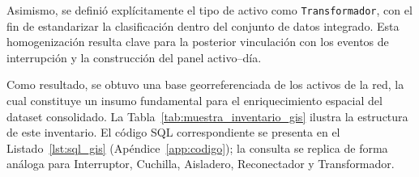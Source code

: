 Asimismo, se definió explícitamente el tipo de activo como \texttt{Transformador}, con el fin de estandarizar la clasificación dentro del conjunto de datos integrado. Esta homogenización resulta clave para la posterior vinculación con los eventos de interrupción y la construcción del panel activo–día.

    Como resultado, se obtuvo una base georreferenciada de los activos de la red, la cual constituye un insumo fundamental para el enriquecimiento espacial del dataset consolidado. La Tabla~\ref{tab:muestra_inventario_gis} ilustra la estructura de este inventario. El código SQL correspondiente se presenta en el Listado~\ref{lst:sql_gis} (Apéndice~\ref{app:codigo}); la consulta se replica de forma análoga para Interruptor, Cuchilla, Aisladero, Reconectador y Transformador.
    
